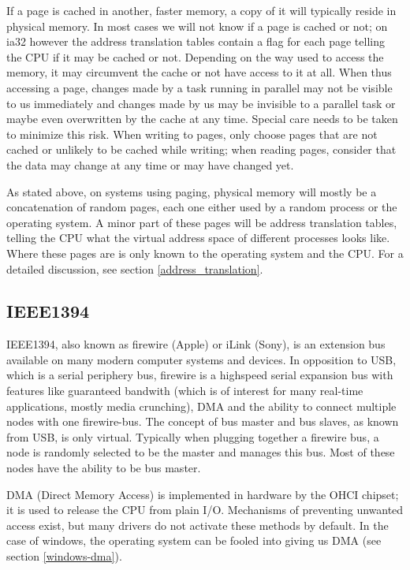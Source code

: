 If a page is cached in another, faster memory, a copy of it will typically
reside in physical memory. In most cases we will not know if a page is cached
or not; on ia32 however the address translation tables contain a flag for each
page telling the CPU if it may be cached or not. Depending on the way used to
access the memory, it may circumvent the cache or not have access to it at all.
When thus accessing a page, changes made by a task running in parallel may not
be visible to us immediately and changes made by us may be invisible to a
parallel task or maybe even overwritten by the cache at any time. Special care
needs to be taken to minimize this risk. When writing to pages, only choose
pages that are not cached or unlikely to be cached while writing; when reading
pages, consider that the data may change at any time or may have changed yet.

As stated above, on systems using paging, physical memory will mostly be a
concatenation of random pages, each one either used by a random process or the
operating system. A minor part of these pages will be address translation
tables, telling the CPU what the virtual address space of different processes
looks like. Where these pages are is only known to the operating system and the
CPU.  For a detailed discussion, see section \ref{address_translation}.



\subsection{IEEE1394}


IEEE1394, also known as firewire (Apple) or iLink (Sony), is an extension bus
available on many modern computer systems and devices.  In opposition to USB,
which is a serial periphery bus, firewire is a highspeed serial expansion bus
with features like guaranteed bandwith (which is of interest for many real-time
applications, mostly media crunching), DMA and the ability to connect multiple
nodes with one firewire-bus. The concept of bus master and bus slaves, as known
from USB, is only virtual. Typically when plugging together a firewire bus, a
node is randomly selected to be the master and manages this bus. Most of these
nodes have the ability to be bus master.

DMA (Direct Memory Access) is implemented in hardware by the OHCI chipset; it
is used to release the CPU from plain I/O. Mechanisms of preventing unwanted
access exist, but many drivers do not activate these methods by default. In the
case of windows, the operating system can be fooled into giving us DMA (see
section \ref{windows-dma}).

